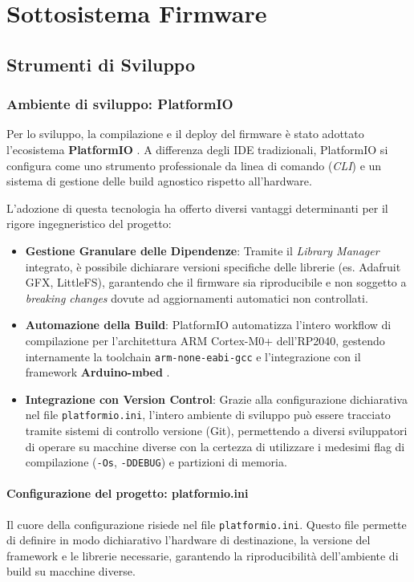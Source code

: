 \newpage
\section{Sottosistema Firmware}

\subsection{Strumenti di Sviluppo}
\subsubsection*{Ambiente di sviluppo: PlatformIO}

Per lo sviluppo, la compilazione e il deploy del firmware è stato adottato l'ecosistema \textbf{PlatformIO} \cite{platformio_os}. A differenza degli IDE tradizionali, PlatformIO si configura come uno strumento professionale da linea di comando (\textit{CLI}) e un sistema di gestione delle build agnostico rispetto all'hardware. 



L'adozione di questa tecnologia ha offerto diversi vantaggi determinanti per il rigore ingegneristico del progetto:
\begin{itemize}
    \item \textbf{Gestione Granulare delle Dipendenze}: Tramite il \textit{Library Manager} integrato, è possibile dichiarare versioni specifiche delle librerie (es. Adafruit GFX, LittleFS), garantendo che il firmware sia riproducibile e non soggetto a \textit{breaking changes} dovute ad aggiornamenti automatici non controllati.
    \item \textbf{Automazione della Build}: PlatformIO automatizza l'intero workflow di compilazione per l'architettura ARM Cortex-M0+ dell'RP2040, gestendo internamente la toolchain \texttt{arm-none-eabi-gcc} e l'integrazione con il framework \textbf{Arduino-mbed} \cite{pico_arduino_core}.
    \item \textbf{Integrazione con Version Control}: Grazie alla configurazione dichiarativa nel file \texttt{platformio.ini}, l'intero ambiente di sviluppo può essere tracciato tramite sistemi di controllo versione (Git), permettendo a diversi sviluppatori di operare su macchine diverse con la certezza di utilizzare i medesimi flag di compilazione (\texttt{-Os}, \texttt{-DDEBUG}) e partizioni di memoria.
\end{itemize}

\paragraph{Configurazione del progetto: platformio.ini}
Il cuore della configurazione risiede nel file \texttt{platformio.ini}. Questo file permette di definire in modo dichiarativo l'hardware di destinazione, la versione del framework e le librerie necessarie, garantendo la riproducibilità dell'ambiente di build su macchine diverse.

